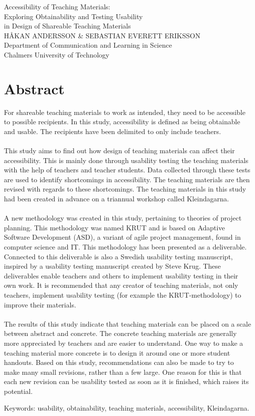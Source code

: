 Accessibility of Teaching Materials:\\
Exploring Obtainability and Testing Usability\\ in Design of Shareable Teaching Materials\\
HÅKAN ANDERSSON \& SEBASTIAN EVERETT ERIKSSON\\
Department of Communication and Learning in Science\\
Chalmers University of Technology \setlength{\parskip}{0.5cm}

\thispagestyle{plain}			%
\setlength{\parskip}{0pt plus 1.0pt}
\section*{Abstract}
For shareable teaching materials to work as intended, they need to be accessible to possible recipients. In this study, accessibility is defined as being obtainable and usable. The recipients have been delimited to only include teachers.
\\ \\
This study aims to find out how design of teaching materials can affect their accessibility. This is mainly done through usability testing the teaching materials with the help of teachers and teacher students. Data collected through these tests are used to identify shortcomings in accessibility. The teaching materials are then revised with regards to these shortcomings. The teaching materials in this study had been created in advance on a triannual workshop called Kleindagarna.
\\ \\
A new methodology was created in this study, pertaining to theories of project planning. This methodology was named KRUT and is based on Adaptive Software Development (ASD), a variant of agile project management, found in computer science and IT. This methodology has been presented as a deliverable. Connected to this deliverable is also a Swedish usability testing manuscript, inspired by a usability testing manuscript created by Steve Krug. These deliverables enable teachers and others to implement usability testing in their own work. It is recommended that any creator of teaching materials, not only teachers, implement usability testing (for example the KRUT-methodology) to improve their materials.
\\ \\
The results of this study indicate that teaching materials can be placed on a scale between abstract and concrete. The concrete teaching materials are generally more appreciated by teachers and are easier to understand. One way to make a teaching material more concrete is to design it around one or more student handouts. Based on this study, recommendations can also be made to try to make many small revisions, rather than a few large. One reason for this is that each new revision can be usability tested as soon as it is finished, which raises its potential. 


\vfill
Keywords: usability, obtainability, teaching materials, accessibility, Kleindagarna.

\newpage				%
\thispagestyle{empty}
\mbox{}